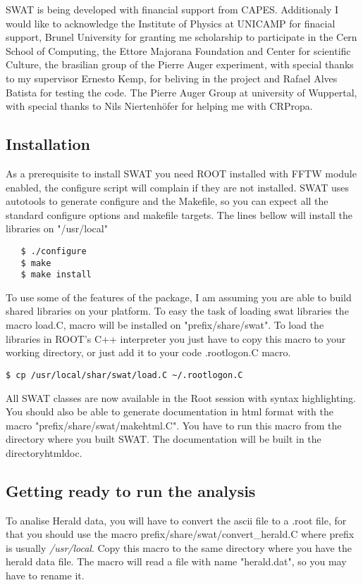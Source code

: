 \documentclass[12pt]{article}
\begin{document}
SWAT is being developed with financial support from CAPES.  Additionaly I would
like to acknowledge the Institute of Physics at UNICAMP for finacial support,
Brunel University for granting me scholarship to participate in the Cern School
of Computing, the Ettore Majorana Foundation and Center for scientific Culture, the brasilian
group of the Pierre Auger experiment, with special thanks to my supervisor
Ernesto Kemp, for beliving in the project and Rafael Alves Batista for testing
the code. The Pierre Auger Group at university of Wuppertal, with special
thanks to Nils Niertenh\"ofer for helping me with CRPropa.

\subsection{Installation} \label{ch::installation}
As a prerequisite to install SWAT you need ROOT installed with FFTW module
enabled, the configure script will complain if they are not installed. SWAT
uses autotools to generate configure and the Makefile, so you can
expect all the standard configure options and makefile targets. The lines 
bellow will install the libraries on {\color{brown}"/usr/local"}
{ \color{brown}
   \begin{lstlisting}
   $ ./configure
   $ make
   $ make install
   \end{lstlisting}
}

To use some of the features of the package, I am assuming you are able to
build shared libraries on your platform.  To easy the task of loading
swat libraries the macro load.C, macro will be installed on {\color{brown}"prefix/share/swat"}. To
load the libraries in ROOT's C++ interpreter you just have to copy this macro
to your working directory, or just add it to your code {\color{brown}.rootlogon.C} macro.

{ \color{brown}
\begin{lstlisting}
$ cp /usr/local/shar/swat/load.C ~/.rootlogon.C
\end{lstlisting}
}

All SWAT classes are now available in the Root session with syntax
highlighting. You should also be able to generate documentation in html format
with the macro {\color{brown}"prefix/share/swat/makehtml.C"}. You have to run
this macro from the directory where you built SWAT. The documentation will be
built in the directory{\color{brown}htmldoc}.

\subsection{Getting ready to run the analysis} \label{ch::ready}
To analise Herald data, you will have to convert the ascii file to a .root
file, for that you should use the macro
{\color{brown}prefix/share/swat/convert\_herald.C} where prefix is usually
\textit{/usr/local}.  Copy this macro to the same directory where you have the
herald data file. The macro will read a file with name
{\color{brown}"herald.dat"}, so you may have to rename it. 
\end{document}
